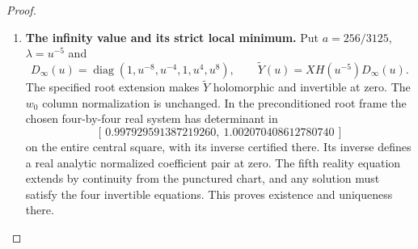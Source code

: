 \begin{proof}
\begin{enumerate}[label=\arabic*.]
\paragraph{The real implicit system and Hessian.}
Use the specified fixed four rows on the central square and
write the actual system as $Mv=b$, with
\[
 M_{i,*}=(\operatorname{Im}Y_{i1},\operatorname{Re}Y_{i1},
          \operatorname{Im}Y_{i2},\operatorname{Re}Y_{i2}),
 \qquad b_i=\operatorname{Re}Y_{i3}.
\]
For the top row define $c$ by the same four coordinate projections,
$d=\operatorname{Re}Y_{03}$ and $h=c_0(cv-d)$,
$c_0=96/(625\pi)$. The certified determinant enclosure excludes
zero on the entire central square and on its sixteen subsquares;
the matrix inverse is therefore the actual one there.
For $a,b\in\{x,y\}$, direct differentiation gives
\[
 \begin{split}
 v_a&=M^{-1}(b_a-M_av),\\
 v_{ab}&=M^{-1}(b_{ab}-M_{ab}v-M_av_b-M_bv_a),\\
 h_a&=c_0(c_av+cv_a-d_a),\\
 h_{ab}&=c_0(c_{ab}v+c_av_b+c_bv_a+cv_{ab}-d_{ab}).
 \end{split}
\]
The repeated-index cases retain both cross terms. The actual
complex derivatives supplying these real projections are
\[
 Y_x=YG,\quad Y_y=iYG,\quad
 Y_{xx}=Y(G^2+G'),\quad Y_{xy}=iY(G^2+G'),\quad
 Y_{yy}=-Y(G^2+G').
\]
Taking the stated real and imaginary parts and carrying out these
products with rigorous full-square balls consequently encloses
all Hessian entries throughout the domain. Approximate row
selection merely chooses a minor; it supplies neither its inverse
nor its error bound.

\item \textbf{The infinity value and its strict local minimum.}
Put $a=256/3125$, $\lambda=u^{-5}$ and
\[
 D_\infty(u)=\operatorname{diag}(1,u^{-8},u^{-4},1,u^4,u^8),
 \qquad \widetilde Y(u)=XH(u^{-5})D_\infty(u).
\]
The specified root extension makes $\widetilde Y$ holomorphic
and invertible at zero. The $w_0$ column normalization is unchanged.
In the preconditioned root frame the chosen four-by-four real
system has determinant in
\[
 [\,0.997929591387219260,\ 1.002070408612780740\,]
\]
on the entire central square, with its inverse certified there.
Its inverse defines a real analytic normalized coefficient pair
at zero. The fifth reality equation extends by continuity from
the punctured chart, and any solution must satisfy the four
invertible equations. This proves existence and uniqueness there.


\end{enumerate}
\end{proof}
